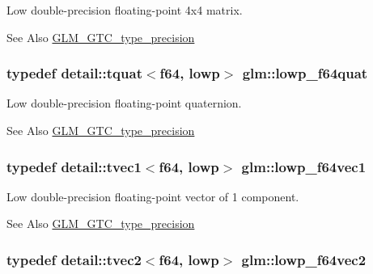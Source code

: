 Low double-\/precision floating-\/point 4x4 matrix. \begin{DoxySeeAlso}{See Also}
\hyperlink{group__gtc__type__precision}{G\-L\-M\-\_\-\-G\-T\-C\-\_\-type\-\_\-precision} 
\end{DoxySeeAlso}
\hypertarget{group__gtc__type__precision_ga225e6f95dd6a7049b1a86db23b90cbac}{
\subsubsection[{lowp\-\_\-f64quat}]{\setlength{\rightskip}{0pt plus 5cm}typedef detail\-::tquat$<$f64, lowp$>$ {\bf glm\-::lowp\-\_\-f64quat}}}\label{group__gtc__type__precision_ga225e6f95dd6a7049b1a86db23b90cbac}
Low double-\/precision floating-\/point quaternion. \begin{DoxySeeAlso}{See Also}
\hyperlink{group__gtc__type__precision}{G\-L\-M\-\_\-\-G\-T\-C\-\_\-type\-\_\-precision} 
\end{DoxySeeAlso}
\hypertarget{group__gtc__type__precision_ga47d9eed23b6e3fc58676176be392293a}{
\subsubsection[{lowp\-\_\-f64vec1}]{\setlength{\rightskip}{0pt plus 5cm}typedef detail\-::tvec1$<$f64, lowp$>$ {\bf glm\-::lowp\-\_\-f64vec1}}}\label{group__gtc__type__precision_ga47d9eed23b6e3fc58676176be392293a}
Low double-\/precision floating-\/point vector of 1 component. \begin{DoxySeeAlso}{See Also}
\hyperlink{group__gtc__type__precision}{G\-L\-M\-\_\-\-G\-T\-C\-\_\-type\-\_\-precision} 
\end{DoxySeeAlso}
\hypertarget{group__gtc__type__precision_gaf2c6cba98bb2c2f1560d8edff4b70938}{
\subsubsection[{lowp\-\_\-f64vec2}]{\setlength{\rightskip}{0pt plus 5cm}typedef detail\-::tvec2$<$f64, lowp$>$ {\bf glm\-::lowp\-\_\-f64vec2}}}\label{group__gtc__type__precision_gaf2c6cba98bb2c2f1560d8edff4b70938}
